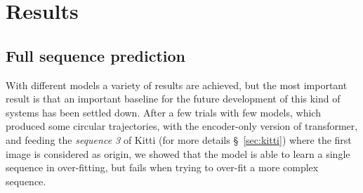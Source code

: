 \section{Results}\label{sec:results}

\subsection{Full sequence prediction}\label{subsec:full-sequence-prediction}
With different models a variety of results are achieved, but the most important result is that an important baseline for the future development of this kind of systems has been settled down.
After a few trials with few models, which produced some circular trajectories, with the encoder-only version of transformer, and feeding the \textit{sequence 3} of Kitti (for more details \S~\ref{sec:kitti}) where the first image is considered as origin, we showed that the model is able to learn a single sequence in over-fitting, but fails when trying to over-fit a more complex sequence.

